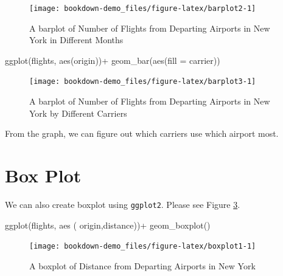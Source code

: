 \documentclass[
]{book}
\newenvironment{Shaded}{\begin{snugshade}}{\end{snugshade}}
\newcommand{\AttributeTok}[1]{\textcolor[rgb]{0.77,0.63,0.00}{#1}}
\newcommand{\FunctionTok}[1]{\textcolor[rgb]{0.00,0.00,0.00}{#1}}
\newcommand{\NormalTok}[1]{#1}
\newcommand{\SpecialCharTok}[1]{\textcolor[rgb]{0.00,0.00,0.00}{#1}}
\begin{document}
\begin{figure}

{\centering \texttt{[image: bookdown-demo\_files/figure-latex/barplot2-1]} 

}

\caption{A barplot of Number of Flights from Departing Airports in New York in Different Months}\label{fig:barplot2}
\end{figure}

\begin{Shaded}
\begin{Highlighting}[]
\FunctionTok{ggplot}\NormalTok{(flights, }\FunctionTok{aes}\NormalTok{(origin))}\SpecialCharTok{+}
  \FunctionTok{geom\_bar}\NormalTok{(}\FunctionTok{aes}\NormalTok{(}\AttributeTok{fill =}\NormalTok{ carrier))}
\end{Highlighting}
\end{Shaded}

\begin{figure}

{\centering \texttt{[image: bookdown-demo\_files/figure-latex/barplot3-1]} 

}

\caption{A barplot of Number of Flights from Departing Airports in New York by Different Carriers}\label{fig:barplot3}
\end{figure}

From the graph, we can figure out which carriers use which airport most.

\hypertarget{box-plot}{%
\section{Box Plot}\label{box-plot}}

We can also create boxplot using \texttt{ggplot2}. Please see Figure \ref{fig:boxplot1}.

\begin{Shaded}
\begin{Highlighting}[]
\FunctionTok{ggplot}\NormalTok{(flights, }\FunctionTok{aes}\NormalTok{ ( origin,distance))}\SpecialCharTok{+}
  \FunctionTok{geom\_boxplot}\NormalTok{()}
\end{Highlighting}
\end{Shaded}

\begin{figure}

{\centering \texttt{[image: bookdown-demo\_files/figure-latex/boxplot1-1]} 

}

\caption{A boxplot of Distance from Departing Airports in New York}\label{fig:boxplot1}
\end{figure}
\end{document}

